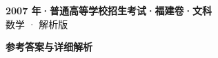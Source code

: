 \documentclass[zihao=-4, a4paper]{ctexart}
\begin{document}
\begin{center}
  {\Large\bfseries 2007 年·普通高等学校招生考试·福建卷·文科}\\[4pt]
  {\large 数学 · 解析版}
\end{center}
\medskip
{}

\clearpage
{}
\begin{center}{\Large\bfseries 参考答案与详细解析}\end{center}
\medskip

\end{document}
